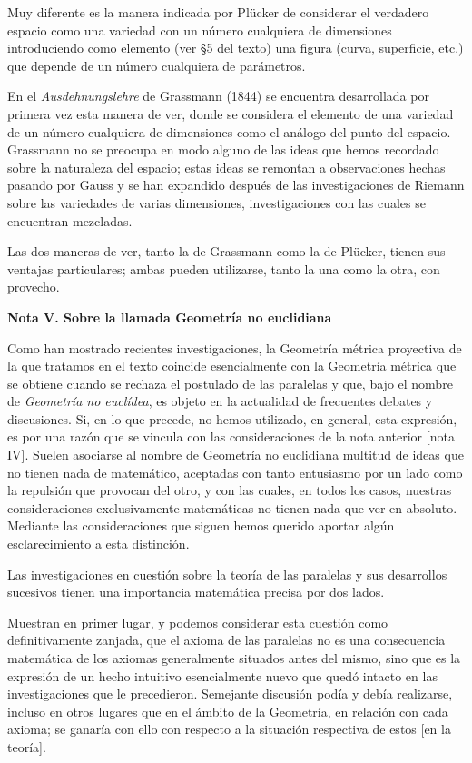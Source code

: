 \documentclass[a4paper, 12pt]{article}
\begin{document}
 Muy diferente es la manera indicada por Plücker de considerar el verdadero espacio como una variedad con un número cualquiera de dimensiones introduciendo como elemento (ver {\S}5 del texto) una figura (curva, superficie, etc.) que depende de un número cualquiera de parámetros. 

 En el \textit{Ausdehnungslehre} de Grassmann (1844) se encuentra desarrollada por primera vez esta manera de ver, donde se considera el elemento de una variedad de un número cualquiera de dimensiones como el análogo del punto del espacio. Grassmann no se preocupa en modo alguno de las ideas que hemos recordado sobre la naturaleza del espacio; estas ideas se remontan a observaciones hechas pasando por Gauss y se han expandido después de las investigaciones de Riemann sobre las variedades de varias dimensiones, investigaciones con las cuales se encuentran mezcladas.

 Las dos maneras de ver, tanto la de Grassmann como la de Plücker, tienen sus ventajas particulares; ambas pueden utilizarse, tanto la una como la otra, con provecho. 

 \noindent\textbf{Nota V. Sobre la llamada Geometría no euclidiana}

 Como han mostrado recientes investigaciones, la Geometría métrica proyectiva de la que tratamos en el texto coincide esencialmente con la Geometría métrica que se obtiene cuando se rechaza el postulado de las paralelas y que, bajo el nombre de \textit{Geometría no euclídea}, es objeto en la actualidad de frecuentes debates y discusiones. Si, en lo que precede, no hemos utilizado, en general, esta expresión, es por una razón que se vincula con las consideraciones de la nota anterior [nota IV]. Suelen asociarse al nombre de Geometría no euclidiana multitud de ideas que no tienen nada de matemático, aceptadas con tanto entusiasmo por un lado como la repulsión que provocan del otro, y con las cuales, en todos los casos, nuestras consideraciones exclusivamente matemáticas no tienen nada que ver en absoluto. Mediante las consideraciones que siguen hemos querido aportar algún esclarecimiento a esta distinción.

 Las investigaciones en cuestión sobre la teoría de las paralelas y sus desarrollos sucesivos tienen una importancia matemática precisa por dos lados.

 Muestran en primer lugar, y podemos considerar esta cuestión como definitivamente zanjada, que el axioma de las paralelas no es una consecuencia matemática de los axiomas generalmente situados antes del mismo, sino que es la expresión de un hecho intuitivo esencialmente nuevo que quedó intacto en las investigaciones que le precedieron. Semejante discusión podía y debía realizarse, incluso en otros lugares que en el ámbito de la Geometría, en relación con cada axioma; se ganaría con ello con respecto a la situación respectiva de estos [en la teoría].
\end{document}
